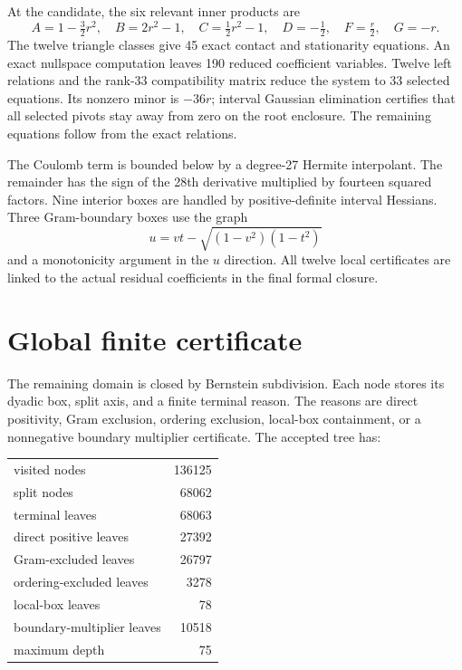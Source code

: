 \documentclass[11pt]{article}
\theoremstyle{definition}
\theoremstyle{remark}
\begin{document}
At the candidate, the six relevant inner products are
\[
 A=1-\tfrac32r^2,\quad B=2r^2-1,\quad C=\tfrac12r^2-1,
 \quad D=-\tfrac12,\quad F=\tfrac r2,\quad G=-r.
\]
The twelve triangle classes give 45 exact contact and stationarity equations.  An exact nullspace computation leaves 190 reduced coefficient variables.  Twelve left relations and the rank-33 compatibility matrix reduce the system to 33 selected equations.  Its nonzero minor is $-36r$; interval Gaussian elimination certifies that all selected pivots stay away from zero on the root enclosure.  The remaining equations follow from the exact relations.

The Coulomb term is bounded below by a degree-27 Hermite interpolant.  The remainder has the sign of the 28th derivative multiplied by fourteen squared factors.  Nine interior boxes are handled by positive-definite interval Hessians.  Three Gram-boundary boxes use the graph
\[
 u=vt-\sqrt{(1-v^2)(1-t^2)}
\]
and a monotonicity argument in the $u$ direction.  All twelve local certificates are linked to the actual residual coefficients in the final formal closure.

\section{Global finite certificate}

The remaining domain is closed by Bernstein subdivision.  Each node stores its dyadic box, split axis, and a finite terminal reason.  The reasons are direct positivity, Gram exclusion, ordering exclusion, local-box containment, or a nonnegative boundary multiplier certificate.  The accepted tree has:

\begin{center}
\begin{tabular}{lr}
\toprule
visited nodes & 136125\\
split nodes & 68062\\
terminal leaves & 68063\\
direct positive leaves & 27392\\
Gram-excluded leaves & 26797\\
ordering-excluded leaves & 3278\\
local-box leaves & 78\\
boundary-multiplier leaves & 10518\\
maximum depth & 75\\
\bottomrule
\end{tabular}
\end{center}
\end{document}
